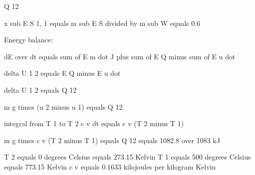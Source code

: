 Q 12

x sub E S 1, 1 equals m sub E S divided by m sub W equals 0.6

Energy balance:

dE over dt equals sum of E m dot J plus sum of E Q minus sum of E u dot

delta U 1 2 equals E Q minus E u dot

delta U 1 2 equals Q 12

m g times (u 2 minus u 1) equals Q 12

integral from T 1 to T 2 c v dt equals c v (T 2 minus T 1)

m g times c v (T 2 minus T 1) equals Q 12 equals 1082.8 over 1083 kJ

T 2 equals 0 degrees Celsius equals 273.15 Kelvin  
T 1 equals 500 degrees Celsius equals 773.15 Kelvin  
c v equals 0.1633 kilojoules per kilogram Kelvin